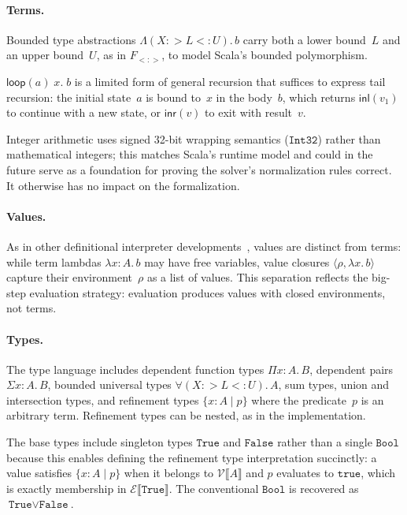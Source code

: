 \documentclass[acmsmall]{acmart}
\begin{document}
\paragraph{Terms.}
Bounded type abstractions $\Lambda (X {:>} L {<:} U).\, b$ carry both a lower bound~$L$ and an upper bound~$U$, as in $F_{<:>}$, to model Scala's bounded polymorphism.

$\textsf{loop}(a)\; x.\; b$ is a limited form of general recursion that suffices to express tail recursion: the initial state~$a$ is bound to~$x$ in the body~$b$, which returns $\textsf{inl}(v_1)$ to continue with a new state, or $\textsf{inr}(v)$ to exit with result~$v$.

Integer arithmetic uses signed 32-bit wrapping semantics ($\texttt{Int32}$) rather than mathematical integers; this matches Scala's runtime model and could in the future serve as a foundation for proving the solver's normalization rules correct. It otherwise has no impact on the formalization.

\paragraph{Values.}
As in other definitional interpreter developments~\cite{owens2016, amin2017}, values are distinct from terms: while term lambdas $\lambda x{:}A.\, b$ may have free variables, value closures $\langle \rho, \lambda x.\, b \rangle$ capture their environment~$\rho$ as a list of values. This separation reflects the big-step evaluation strategy: evaluation produces values with closed environments, not terms.

\paragraph{Types.}
The type language includes dependent function types $\Pi x{:}A.\, B$, dependent pairs $\Sigma x{:}A.\, B$, bounded universal types $\forall (X {:>} L {<:} U).\, A$, sum types, union and intersection types, and refinement types $\{x : A \mid p\}$ where the predicate~$p$ is an arbitrary term. Refinement types can be nested, as in the implementation.

The base types include singleton types $\texttt{True}$ and $\texttt{False}$ rather than a single $\texttt{Bool}$ because this enables defining the refinement type interpretation succinctly: a value satisfies $\{x : A \mid p\}$ when it belongs to $\mathcal{V}\llbracket A \rrbracket$ and $p$ evaluates to $\texttt{true}$, which is exactly membership in $\mathcal{E}\llbracket \texttt{True} \rrbracket$. The conventional $\texttt{Bool}$ is recovered as $\texttt{True} \lor \texttt{False}$.
\end{document}
